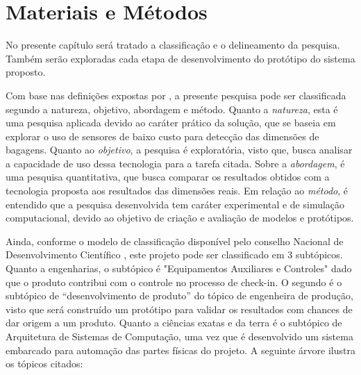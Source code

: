 %
\chapter[Materiais e Métodos]{Materiais e Métodos}
\label{cap_Materiais e Metodos}

    No presente capítulo será tratado a classificação e o delineamento da pesquisa. Também serão exploradas cada etapa de desenvolvimento do protótipo do sistema proposto.
    

    Com base nas definições expostas por , a presente pesquisa pode ser classificada segundo a natureza, objetivo, abordagem e método. Quanto a \textit{natureza}, esta é uma pesquisa aplicada devido ao caráter prático da solução, que se baseia em explorar o uso de sensores de baixo custo para detecção das dimensões de bagagens. Quanto ao \textit{objetivo}, a pesquisa é exploratória, visto que, busca analisar a capacidade de uso dessa tecnologia para a tarefa citada. Sobre a \textit{abordagem}, é uma pesquisa quantitativa, que busca comparar os resultados obtidos com a tecnologia proposta aos resultados das dimensões reais. Em relação ao \textit{método}, é entendido que a pesquisa desenvolvida tem caráter experimental e de simulação computacional, devido ao objetivo de criação e avaliação de modelos e protótipos. 
    
    Ainda, conforme o modelo de classificação disponível pelo conselho Nacional de Desenvolvimento Científico \cite{cnpq_2022_engenharias}, este projeto pode ser classificado em 3 subtópicos. Quanto a engenharias, o subtópico é "Equipamentos Auxiliares e Controles" dado que o produto contribui com o controle no processo de check-in. O segundo é o subtópico de “desenvolvimento de produto” do tópico de engenheira de produção, visto que será construído um protótipo para validar os resultados com chances de dar origem a um produto. Quanto a ciências exatas e da terra é o subtópico de Arquitetura de Sistemas de Computação, uma vez que é desenvolvido um sistema embarcado para automação das partes físicas do projeto. A seguinte árvore ilustra os tópicos citados:
    
\label{tree:Árvore de classificação da presente pesquisa} 
    



